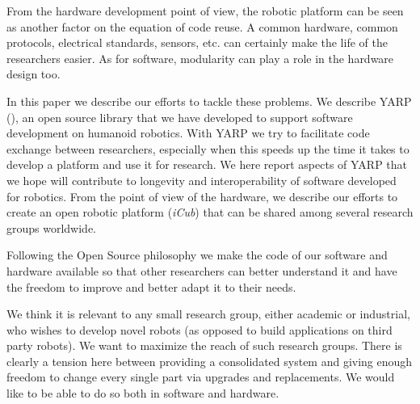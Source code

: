 %
From the hardware development point of view, the robotic platform can 
be seen as another factor on the
equation of code reuse. A common hardware, common protocols,
electrical standards, sensors, etc. can certainly make the 
life of the researchers easier. As for software, modularity 
can play a role in the hardware design too. 

In this paper we describe our efforts to tackle these problems. We 
describe YARP (\cite{metta2006yarp}), an open source library 
that we have developed to support software development on humanoid 
robotics. With YARP we try to facilitate code exchange between researchers, 
especially when this speeds up the time 
it takes to develop a platform and use it for research. We here report 
aspects of YARP that we hope will contribute to longevity and 
interoperability of software developed for robotics. From the 
point of view of the hardware, we describe our efforts to create an open 
robotic platform (\emph{iCub}) that can be shared among several research 
groups worldwide.

Following the Open Source philosophy we make the 
code of our software and hardware available so that other 
researchers can better understand it and have the freedom 
to improve and better adapt it to their needs.


%
We think it is relevant to any small research group, either academic or
industrial, who wishes to develop novel robots (as opposed to 
build applications on third party robots).  We want to maximize the 
reach of such research groups. There is clearly a tension here 
between providing a consolidated system and giving enough freedom
to change every single part via upgrades and replacements. We would
like to be able to do so both in software and hardware.




